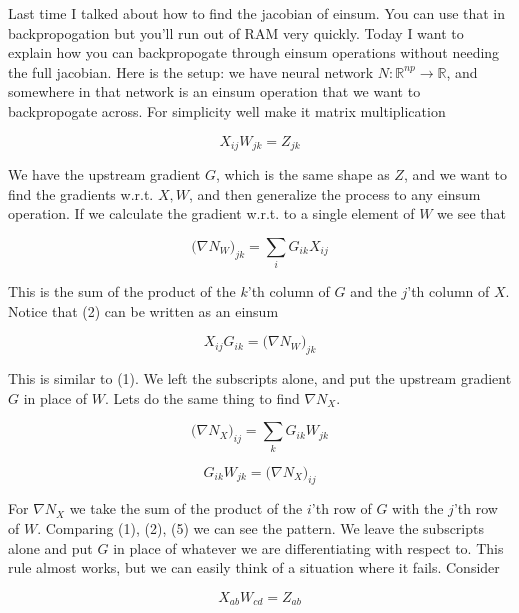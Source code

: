 \documentclass[11pt]{article}
\begin{document}
Last time I talked about
how to find the jacobian of einsum. You can use that in backpropogation
but you'll run out of RAM very quickly. 
Today I want to explain how you can backpropogate through einsum operations 
without needing the full jacobian. Here is the setup: we have neural
network 
$N : \mathbb{R}^{np} \rightarrow \mathbb{R}$, and somewhere in that network
is an einsum operation that we want to backpropogate across.
For simplicity well make it matrix multiplication

\begin{equation}
    X_{ij}W_{jk} = Z_{jk}
\end{equation}

We have the upstream gradient $G$, 
which is the same shape as $Z$,
and we want to find the gradients w.r.t. $X, W$,
and then generalize the process to any einsum operation. 
If we calculate the
gradient w.r.t. to a single element of $W$ we see that

\begin{equation}
    \bigl(\nabla N_{W}\bigr)_{jk} = \sum_i G_{ik}X_{ij}
\end{equation}

This is the sum of the product of the $k$'th column of $G$ and the $j$'th column
of $X$. Notice that (2) can be written as an einsum

\begin{equation}
    X_{ij}G_{ik} = \bigl(\nabla N_{W} \bigr)_{jk}
\end{equation}

This is similar to (1). We left the subscripts alone, and put the upstream gradient $G$ 
in place of $W$. Lets do the same thing to find $\nabla N_X$.

\begin{equation}
    \bigl(\nabla N_{X}\bigr)_{ij} = \sum_k G_{ik}W_{jk}
\end{equation}

\begin{equation}
    G_{ik}W_{jk} = \bigl(\nabla N_{X} \bigr)_{ij}
\end{equation}

For $\nabla N_X$ we take the sum of the product of the $i$'th row of $G$ with the $j$'th row 
of $W$. Comparing (1), (2), (5) we can see the pattern. 
We leave the subscripts alone and put $G$ in place of whatever we are 
differentiating with respect to. 
This rule almost works, but we can easily think of a situation where it fails. Consider

\begin{equation}
    X_{ab}W_{cd} = Z_{ab}
\end{equation}
\end{document}
